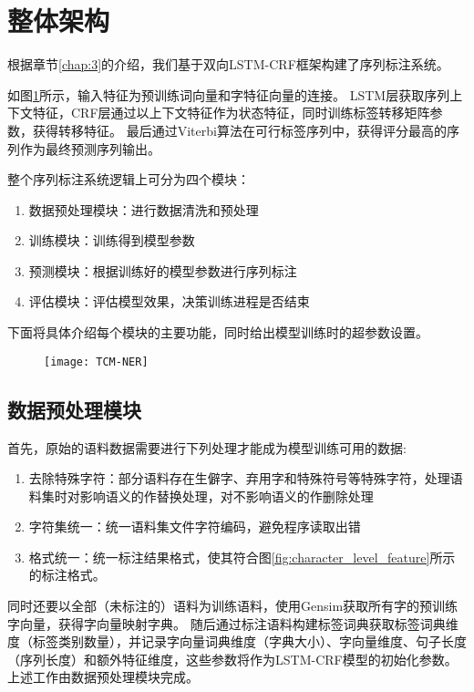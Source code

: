 \section{整体架构}
根据章节\ref{chap:3}的介绍，我们基于双向LSTM-CRF框架构建了序列标注系统。

如图\ref{fig:TCM_NER}所示，输入特征为预训练词向量和字特征向量的连接。
LSTM层获取序列上下文特征，CRF层通过以上下文特征作为状态特征，同时训练标签转移矩阵参数，获得转移特征。
最后通过Viterbi算法在可行标签序列中，获得评分最高的序列作为最终预测序列输出。

整个序列标注系统逻辑上可分为四个模块：
\begin{enumerate}[leftmargin=*]
    \item[(1)] 数据预处理模块：进行数据清洗和预处理
    \item[(2)] 训练模块：训练得到模型参数
    \item[(3)] 预测模块：根据训练好的模型参数进行序列标注
    \item[(4)] 评估模块：评估模型效果，决策训练进程是否结束
\end{enumerate}
下面将具体介绍每个模块的主要功能，同时给出模型训练时的超参数设置。

\begin{figure}[H]
    \centering
    \texttt{[image: TCM-NER]}
    \label{fig:TCM_NER}
\end{figure}
\subsection{数据预处理模块}
首先，原始的语料数据需要进行下列处理才能成为模型训练可用的数据:
\begin{enumerate}[leftmargin=*]
    \item[(1)] 去除特殊字符：部分语料存在生僻字、弃用字和特殊符号等特殊字符，处理语料集时对影响语义的作替换处理，对不影响语义的作删除处理
    \item[(2)] 字符集统一：统一语料集文件字符编码，避免程序读取出错
    \item[(3)] 格式统一：统一标注结果格式，使其符合图\ref{fig:character_level_feature}所示的标注格式。
\end{enumerate}

同时还要以全部（未标注的）语料为训练语料，使用Gensim获取所有字的预训练字向量，获得字向量映射字典。
随后通过标注语料构建标签词典获取标签词典维度（标签类别数量），并记录字向量词典维度（字典大小）、字向量维度、句子长度（序列长度）和额外特征维度，这些参数将作为LSTM-CRF模型的初始化参数。
上述工作由数据预处理模块完成。
